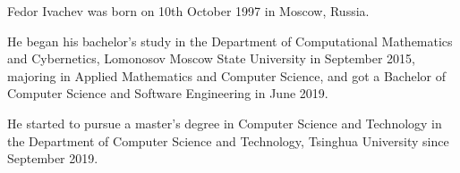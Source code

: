 
\begin{resume}
    Fedor Ivachev was born on 10th October 1997 in Moscow, Russia.
    
    He began his bachelor's study in the Department of Computational Mathematics and Cybernetics, Lomonosov Moscow State University in September 2015, majoring in Applied Mathematics and Computer Science, and got a Bachelor of Computer Science and Software Engineering in June 2019.
    
    He started to pursue a master's degree in Computer Science  and Technology in the Department of Computer Science and Technology, Tsinghua University since September 2019.
\end{resume}
